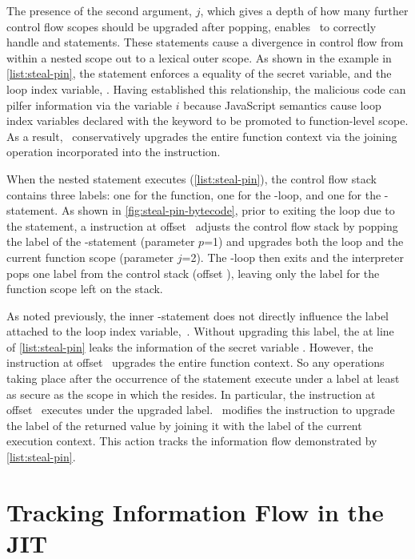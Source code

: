 The presence of the second argument, $j$, which gives a depth of how many further control flow scopes should be upgraded after popping, enables \JitFlow\ to correctly handle  and  statements.
These statements cause a divergence in control flow from within a nested scope out to a lexical outer scope.
As shown in the example in \autoref{list:steal-pin}, the  statement enforces a equality of the secret variable,  and the loop index variable, .
Having established this relationship, the malicious code can pilfer information via the variable $i$ because JavaScript semantics cause loop index variables declared with the  keyword to be promoted to function-level scope.
As a result, \JitFlow\ conservatively upgrades the entire function context via the joining operation incorporated into the \popj instruction.

When the nested  statement executes (\autoref{list:steal-pin}), the control flow stack contains three labels: one for the function, one for the -loop, and one for the -statement.
As shown in \autoref{fig:steal-pin-bytecode}, prior to exiting the loop due to the  statement, a \popj instruction at offset~ adjusts the control flow stack by popping the label of the -statement (parameter $p$=1) and upgrades both the  loop and the current function scope (parameter $j$=2).
The -loop then exits and the interpreter pops one label from the control stack (offset ), leaving only the label for the function scope left on the stack.

As noted previously, the inner -statement does not directly influence the label attached to the loop index variable,~.
Without upgrading this label, the  at line~ of \autoref{list:steal-pin} leaks the information of the secret variable .
However, the \popj instruction at offset~ upgrades the entire function context.
So any operations taking place after the occurrence of the  statement execute under a label at least as secure as the scope in which the  resides.
In particular, the  instruction at offset~ executes under the upgraded label.
\JitFlow\ modifies the  instruction to upgrade the label of the returned value by joining it with the label of the current execution context.
This action tracks the information flow demonstrated by \autoref{list:steal-pin}.

\section{Tracking Information Flow in the JIT}\label{ch:implementation-sec:jitflow}

